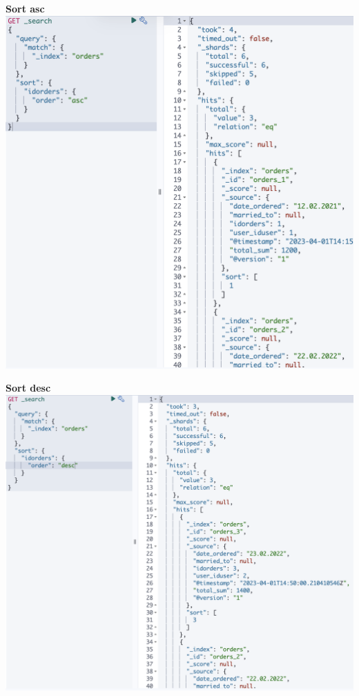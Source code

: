 \documentclass[14pt,a4paper]{extarticle}
\begin{document}
	\newpage

	\noindent \textbf{Sort asc} \\
	\includegraphics[height=0.45\textheight]{images/asc.png}

	\noindent \textbf{Sort desc} \\
	\includegraphics[height=0.45\textheight]{images/desc.png}
\end{document}
